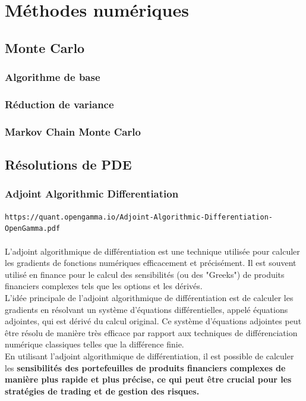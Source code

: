 \documentclass[a4paper]{article}
\begin{document}
\section{Méthodes numériques}

 \subsection{Monte Carlo}

\subsubsection{Algorithme de base}
\subsubsection{Réduction de variance}
\subsubsection{Markov Chain Monte Carlo}
 
 \subsection{Résolutions de PDE}

 \subsubsection{Adjoint Algorithmic Differentiation}
  \texttt{https://quant.opengamma.io/Adjoint-Algorithmic-Differentiation-OpenGamma.pdf}
  \\
  \vspace{0.5mm}
  \\
 L'adjoint algorithmique de différentiation est une technique utilisée pour calculer les gradients de fonctions numériques efficacement et précisément. Il est souvent utilisé en finance pour le calcul des sensibilités (ou des "Greeks") de produits financiers complexes tels que les options et les dérivés.\\
 L'idée principale de l'adjoint algorithmique de différentiation est de calculer les gradients en résolvant un système d'équations différentielles, appelé équations adjointes, qui est dérivé du calcul original. Ce système d'équations adjointes peut être résolu de manière très efficace par rapport aux techniques de différenciation numérique classiques telles que la différence finie.
\\
En utilisant l'adjoint algorithmique de différentiation, il est possible de calculer les \textbf{sensibilités des portefeuilles de produits financiers complexes de manière plus rapide et plus précise, ce qui peut être crucial pour les stratégies de trading et de gestion des risques.}
\end{document}
